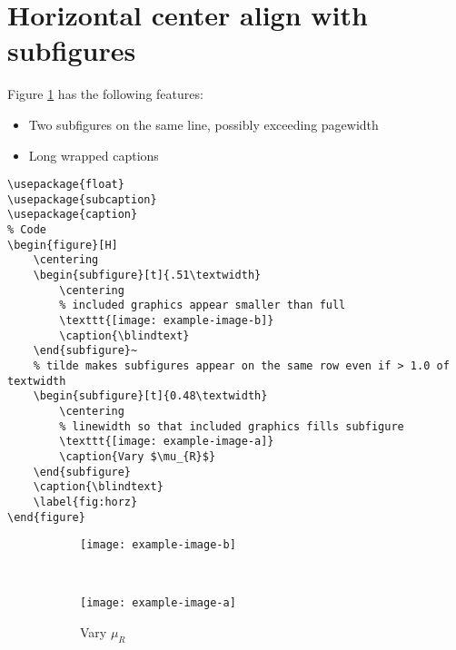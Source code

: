 \documentclass[12pt,english]{article}
\begin{document}
\section{Horizontal center align with subfigures}

Figure \ref{fig:horz} has the following features:
\begin{itemize}
    \item Two subfigures on the same line, possibly exceeding pagewidth
    \item Long wrapped captions
\end{itemize}

\begin{lstlisting}[frame=single]
% Included Package
\usepackage{float}
\usepackage{subcaption}
\usepackage{caption}
% Code
\begin{figure}[H]
    \centering
    \begin{subfigure}[t]{.51\textwidth}
        \centering
        % included graphics appear smaller than full
        \texttt{[image: example-image-b]}
        \caption{\blindtext}
    \end{subfigure}~
    % tilde makes subfigures appear on the same row even if > 1.0 of textwidth
	\begin{subfigure}[t]{0.48\textwidth}
	    \centering
	    % linewidth so that included graphics fills subfigure
    	\texttt{[image: example-image-a]}
    	\caption{Vary $\mu_{R}$}
	\end{subfigure}
	\caption{\blindtext}
	\label{fig:horz}
\end{figure}
\end{lstlisting}

\par\medskip
\begin{figure}[H]
    \centering
    \begin{subfigure}[t]{.51\textwidth}
        \centering
        \texttt{[image: example-image-b]}
        \caption{\blindtext}
    \end{subfigure}~
	\begin{subfigure}[t]{0.48\textwidth}
	    \centering
    	\texttt{[image: example-image-a]}
    	\caption{Vary $\mu_{R}$}
	\end{subfigure}
	\caption{\blindtext}
	\label{fig:horz}
\end{figure}
\pagebreak
\end{document}
